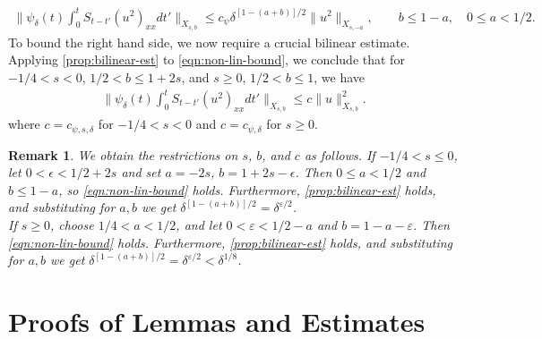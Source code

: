 \documentclass[12pt,reqno]{amsart}
\numberwithin{equation}{section}  %
\newcommand{\ee}{\varepsilon}
\newtheorem{remark}[theorem]{Remark}
\begin{document}
\begin{appendices}
\begin{equation}
\begin{split}
  \|\psi_{\delta}(t) \int_{0}^{t} S_{t-t'} (u^{2})_{xx} dt'\|_{X_{s,b}} \le
  c_{\psi} \delta^{[1- (a + b)]/2}\| u^{2}
  \|_{X_{s,-a}}, \qquad b \le 1-a, \quad 0 \le a < 1/2.
\end{split}
\label{eqn:non-lin-bound}
\end{equation}
%
%
To bound the right hand side, we now require a crucial bilinear
estimate.
%
%
%
%
%
%
Applying \cref{prop:bilinear-est} to \eqref{eqn:non-lin-bound}, we conclude that
for $-1/4 < s < 0$, $1/2 < b \le 1 + 2s$, and $s \ge 0$, $1/2 < b \le 1$, we have 
%
%
\begin{equation}
\begin{split}
  \|\psi_{\delta}(t) \int_{0}^{t} S_{t-t'} (u^{2})_{xx} dt'\|_{X_{s,b}} \le
  c \| u \|^2_{X_{s,b}}. 
\end{split}
\label{eqn:nonlinear-term-bound}
\end{equation}
%
%
where $c = c_{\psi, s, \delta}$ for $-1/4 < s < 0$ and $c =c_{\psi, \delta}$ for $s \ge
0$.  
%
%
\begin{framed}
\begin{remark}
We obtain the restrictions on $s$, $b$, and $c$ as follows. If $-1/4 < s \le 0$, let
$0 < \epsilon < 1/2 + 2s$ and set
$a = -2s$, $b = 1 + 2s - \epsilon$. Then $0 \le a < 1/2$ and $b \le 1-a$,
so \eqref{eqn:non-lin-bound} holds. Furthermore, \cref{prop:bilinear-est} holds,
and substituting for $a,b$ we get $\delta^{[1-(a + b)]/2} = \delta^{\ee/2}$.
\\
If $ s \ge 0$, choose $1/4 < a < 1/2$, and let $0 < \ee < 1/2 -a$ and $b = 1-a
-\ee$. Then
\eqref{eqn:non-lin-bound} holds. Furthermore, 
\cref{prop:bilinear-est} holds, and substituting for $a, b$ we get $\delta^{\left[
1- (a + b) \right]/2} = \delta^{\ee/2} < \delta^{1/8}$. 
\end{remark}
\end{framed}
%
%
%
%
%
%
%
%
%
\section{Proofs of Lemmas and Estimates} 
\label{sec:pfs-lems-est}
%

\end{appendices}
\end{document}
